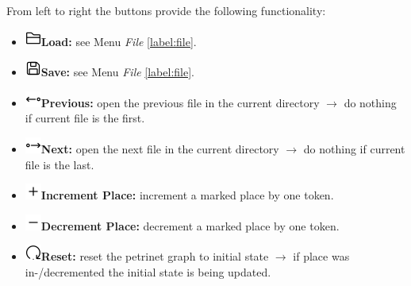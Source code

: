 \documentclass[10pt, a4paper]{article}
\begin{document}
From left to right the buttons provide the following functionality:

\begin{itemize}

\item\includegraphics[scale=0.4]{../resources/images/Toolbar/folder.png}\hspace{0.1cm}\textbf{Load:} see Menu \textit{File} \ref{label:file}.
\item\includegraphics[scale=0.4]{../resources/images/Toolbar/save.png}\hspace{0.1cm}\textbf{Save:} see Menu \textit{File} \ref{label:file}.
\item\includegraphics[scale=0.4]{../resources/images/Toolbar/left.png}\hspace{0.1cm}\textbf{Previous:} open the previous file in the current directory $\rightarrow$ do nothing if current file is the first.
\item\includegraphics[scale=0.4]{../resources/images/Toolbar/right.png}\hspace{0.1cm}\textbf{Next:} open the next file in the current directory $\rightarrow$ do nothing if current file is the last.
\item\includegraphics[scale=0.4]{../resources/images/Toolbar/plus.png}\hspace{0.1cm}\textbf{Increment Place:} increment a marked place by one token.
\item\includegraphics[scale=0.4]{../resources/images/Toolbar/minus.png}\hspace{0.1cm}\textbf{Decrement Place:} decrement a marked place by one token.
\item\includegraphics[scale=0.4]{../resources/images/Toolbar/restart.png}\hspace{0.1cm}\textbf{Reset:} reset the petrinet graph to initial state $\rightarrow$ if place was in-/decremented the initial state is being updated.

\end{itemize}
\end{document}
